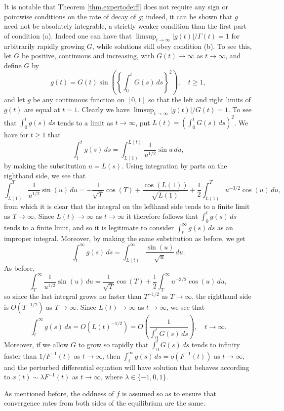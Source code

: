 \documentclass[a4paper,10pt,reqno]{amsart}
\numberwithin{equation}{section}
\theoremstyle{definition}
\theoremstyle{remark}
\DeclareMathOperator{\1}{\mathbbm 1}
\begin{document}
	
	It is notable that Theorem \ref{thm.expertodeiff} does not require any sign or pointwise conditions on the rate of decay of $g$; indeed, it can be shown that $g$ need not be absolutely integrable, a strictly weaker condition than the first part of condition (a). Indeed 
	one can have that $\limsup_{t\to\infty} |g(t)|/\Gamma(t)=1$ for arbitrarily rapidly growing $G$, while solutions still obey condition (b). To see this, let $G$ be positive, continuous and increasing, with $G(t)\to\infty$ as $t\to\infty$, and define $G$ by 
	\[
	g(t)=G(t)\sin\left(\left\{\int_0^t G(s)\,ds\right\}^2\right), \quad t\geq 1,
	\]
	and let $g$ be any continuous function on $[0,1]$ so that the left and right limits of $g(t)$ are equal at $t=1$. Clearly we have $\limsup_{t\to\infty} |g(t)|/G(t)=1$. To see that $\int_0^t g(s)\,ds$ tends to a limit as $t\to\infty$, put $L(t)=(\int_0^t G(s)\,ds)^2$. We have for $t\geq 1$ that 
	\[
	\int_1^t g(s)\,ds = \int_{L(1)}^{L(t)} \frac{1}{u^{1/2}}\sin{u}\,du,
	\]
	by making the substitution $u=L(s)$. Using integration by parts on the righthand side, we see that 
	\[
	\int_{L(1)}^T  \frac{1}{u^{1/2}}\sin(u)\,du = -\frac{1}{\sqrt{T}}\cos(T)+\frac{\cos(L(1))}{\sqrt{L(1)}}+\frac{1}{2}\int_{L(1)}^T u^{-3/2} \cos(u)\,du,
	\]
	from which it is clear that the integral on the lefthand side tends to a finite limit as $T\to\infty$. Since $L(t)\to\infty$ as $t\to\infty$ it therefore follows that $\int_0^t g(s)\,ds$ tends to a finite limit, and so it is legitimate to consider $\int_t^\infty g(s)\,ds$ as an improper integral. Moreover, by making the same substitution as before, we get 
	\[
	\int_t^\infty g(s)\,ds = \int_{L(t)}^\infty \frac{\sin(u)}{\sqrt{u}}\,du.
	\]
	As before, 
	\[
	\int_T^\infty \frac{1}{u^{1/2}}\sin(u)\,du = \frac{1}{\sqrt{T}}\cos(T)+\frac{1}{2}\int_T^\infty u^{-3/2} \cos(u)\,du,
	\]
	so since the last integral grows no faster than $T^{-1/2}$ as $T\to\infty$, the righthand side is $O(T^{-1/2})$ as $T\to\infty$. Since $L(t)\to \infty$ as $t\to\infty$, we see that 
	\[
	\int_t^\infty g(s)\,ds = O(L(t)^{-1/2}) = O\left(\frac{1}{\int_0^t G(s)\,ds} \right), \quad t\to\infty.
	\]
	Moreover, if we allow $G$ to grow so rapidly that $\int_0^t G(s)\,ds$ tends to infinity faster than $1/F^{-1}(t)$ as $t\to\infty$, then $\int_t^\infty g(s)\,ds = o(F^{-1}(t))$ as $t\to\infty$, and the perturbed differential equation will have solution that behaves according to $x(t)\sim \lambda F^{-1}(t)$ as $t\to\infty$, where $\lambda\in \{-1,0,1\}$.   
	
	As mentioned before, the  
	oddness of $f$ is assumed so as to ensure that convergence rates from both sides of the equilibrium are the same.  
	
\end{document}
